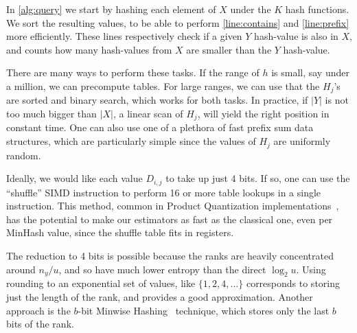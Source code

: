 In \cref{alg:query} we start by hashing each element of $X$ under the $K$ hash functions.
We sort the resulting values, to be able to perform \cref{line:contains} and \cref{line:prefix} more efficiently.
These lines respectively check if a given $Y$ hash-value is also in $X$, and counts how many hash-values from $X$ are smaller than the $Y$ hash-value.

There are many ways to perform these tasks.
If the range of $h$ is small, say under a million, we can precompute tables.
For large ranges, we can use that the $H_j$'s are sorted and binary search, which works for both tasks.
In practice, if $|Y|$ is not too much bigger than $|X|$, a linear scan of $H_j$, will yield the right position in constant time.
One can also use one of a plethora of fast prefix sum data structures, which are particularly simple since the values of $H_j$ are uniformly random.

Ideally, we would like each value $D_{i,j}$ to take up just 4 bits.
If so, one can use the ``shuffle'' SIMD instruction to perform 16 or more table lookups in a single instruction.
This method, common in Product Quantization implementations~\cite{andre2019quicker}, has the potential to make our estimators as fast as the classical one, even per MinHash value, since the shuffle table fits in registers.

The reduction to 4 bits is possible because the ranks are heavily concentrated around $n_y/u$, and so have much lower entropy than the direct $\log_2 u$.
Using rounding to an exponential set of values, like $\{1, 2, 4, \dots\}$ corresponds to storing just the length of the rank, and provides a good approximation.
Another approach is the $b$-bit Minwise Hashing~\cite{li2010b} technique, which stores only the last $b$ bits of the rank.
